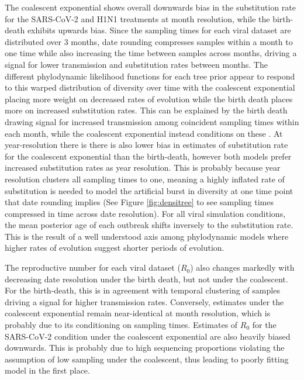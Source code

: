 \documentclass[11pt]{article}
\begin{document}
\begin{spacing}{1.5}
The coalescent exponential shows overall downwards bias in the substitution rate for the SARS-CoV-2 and H1N1 treatments at month resolution, while the birth-death exhibits upwards bias. Since the sampling times for each viral dataset are distributed over 3 months, date rounding compresses samples within a month to one time while also increasing the time between samples across months, driving a signal for lower transmission and substitution rates between months. The different phylodynamic likelihood functions for each tree prior appear to respond to this warped distribution of diversity over time with the coalescent exponential placing more weight on decreased rates of evolution while the birth death places more on increased substitution rates. This can be explained by the birth death drawing signal for increased transmission among coincident sampling times within each month, while the coalescent exponential instead conditions on these \citep{volz_sampling_2014}. At year-resolution there is there is also lower bias in estimates of substitution rate for the coalescent exponential than the birth-death, however both models prefer increased substitution rates as year resolution. This is probably because year resolution clusters all sampling times to one, meaning a highly inflated rate of substitution is needed to model the artificial burst in diversity at one time point that date rounding implies (See Figure \ref{fig:densitree} to see sampling times compressed in time across date resolution). For all viral simulation conditions, the mean posterior age of each outbreak shifts inversely to the substitution rate. This is the result of a well understood axis among phylodynamic models where higher rates of evolution suggest shorter periods of evolution.

The reproductive number for each viral dataset ($R_0$) also changes markedly with decreasing date resolution under the birth death, but not under the coalescent. For the birth-death, this is in agreement with temporal clustering of samples driving a signal for higher transmission rates. Conversely, estimates under the coalescent exponential remain near-identical at month resolution, which is probably due to its conditioning on sampling times. Estimates of $R_0$ for the SARS-CoV-2 condition under the coalescent exponential are also heavily biased downwards. This is probably due to high sequencing proportions violating the assumption of low sampling under the coalescent, thus leading to poorly fitting model in the first place.


\end{spacing}
\end{document}
